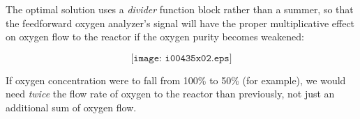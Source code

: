 





The optimal solution uses a {\it divider} function block rather than a summer, so that the feedforward oxygen analyzer's signal will have the proper multiplicative effect on oxygen flow to the reactor if the oxygen purity becomes weakened:

$$\texttt{[image: i00435x02.eps]}$$

If oxygen concentration were to fall from 100\% to 50\% (for example), we would need {\it twice} the flow rate of oxygen to the reactor than previously, not just an additional sum of oxygen flow.











